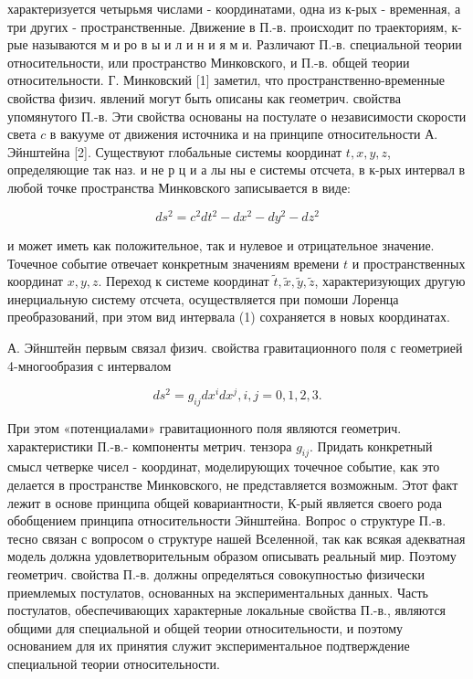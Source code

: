 \documentclass[10pt]{article}
\begin{document}
характеризуется четырьмя числами - координатами, одна из к-рых - временная, а три других - пространственные. Движение в П.-в. происходит по траекториям, к-рые называются м и ро в ы и л и н и я м и. Различают П.-в. специальной теории относительности, или пространство Минковского, и П.-в. общей теории относительности. Г. Минковский [1] заметил, что пространственно-временные свойства физич. явлений могут быть описаны как геометрич. свойства упомянутого П.-в. Эти свойства основаны на постулате о независимости скорости света $c$ в вакууме от движения источника и на принципе относительности А. Эйнштейна [2]. Существуют глобальные системы координат $t, x, y, z$, определяющие так наз. и не р ц и а лы ны е системы отсчета, в к-рых интервал в любой точке пространства Минковского записывается в виде:



\[

d s^{2}=c^{2} d t^{2}-d x^{2}-d y^{2}-d z^{2}

\]



и может иметь как положительное, так и нулевое и отрицательное значение. Точечное событие отвечает конкретным значениям времени $t$ и пространственных координат $x, y, z$. Переход к системе координат $\tilde{t}, \tilde{x}, \tilde{y}, \tilde{z}$, характеризующих другую инерциальную систему отсчета, осуществляется при помоши Лоренца преобразований, при этом вид интервала (1) сохраняется в новых координатах.



А. Эйнштейн первым связал физич. свойства гравитационного поля с геометрией 4-многообразия с интервалом



\[

d s^{2}=g_{i j} d x^{i} d x^{j}, i, j=0,1,2,3 .

\]



При этом «потенциалами» гравитационного поля являются геометрич. характеристики П.-в.- компоненты метрич. тензора $g_{i j}$. Придать конкретный смысл четверке чисел - координат, моделирующих точечное событие, как это делается в пространстве Минковского, не представляется возможным. Этот факт лежит в основе принципа общей ковариантности, К-рый является своего рода обобщением принципа относительности Эйнштейна. Вопрос о структуре П.-в. тесно связан с вопросом о структуре нашей Вселенной, так как всякая адекватная модель должна удовлетворительным образом описывать реальный мир. Поэтому геометрич. свойства П.-в. должны определяться совокупностью физически приемлемых постулатов, основанных на экспериментальных данных. Часть постулатов, обеспечивающих характерные локальные свойства П.-в., являются общими для специальной и общей теории относительности, и поэтому основанием для их принятия служит экспериментальное подтверждение специальной теории относительности.
\end{document}
